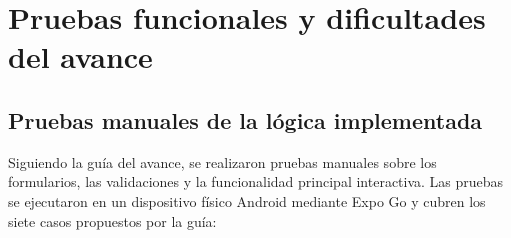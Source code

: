 
\section{Pruebas funcionales y dificultades del avance}

\subsection{Pruebas manuales de la l\'ogica implementada}

Siguiendo la gu\'ia del avance, se realizaron pruebas manuales sobre los
formularios, las validaciones y la funcionalidad principal interactiva.
Las pruebas se ejecutaron en un dispositivo f\'isico Android mediante
Expo Go y cubren los siete casos propuestos por la gu\'ia:

